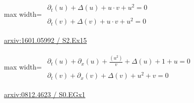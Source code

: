 \documentclass[UTF8,10pt,a4paper,fontset=mac]{ctexart}
\begin{document}
\begin{minipage}{\linewidth}\begin{center}\begin{adjustbox}{max width=\linewidth}$\displaystyle\begin{gathered}\begin{gathered}\partial_{t}(u)+\Delta(u)+u\cdot v+u^{2}=0\end{gathered}\\[5pt]\begin{gathered}\partial_{t}(v)+\Delta(v)+u\cdot v+u^{2}=0\end{gathered}\end{gathered}$\end{adjustbox}\end{center}{\small\href{https://arxiv.org/html/1601.05992#S2.Ex15}{arxiv:1601.05992 / S2.Ex15}}\par\end{minipage}\par\vspace{6mm}

\begin{minipage}{\linewidth}\begin{center}\begin{adjustbox}{max width=\linewidth}$\displaystyle\begin{gathered}\begin{gathered}\partial_{t}(u)+\partial_{x}(u)+\frac{(u^{2})}{v}+\Delta(u)+1+u=0\end{gathered}\\[5pt]\begin{gathered}\partial_{t}(v)+\partial_{x}(v)+\Delta(v)+u^{2}+v=0\end{gathered}\end{gathered}$\end{adjustbox}\end{center}{\small\href{https://arxiv.org/html/0812.4623#S0.EGx1}{arxiv:0812.4623 / S0.EGx1}}\par\end{minipage}\par\vspace{6mm}
\end{document}

